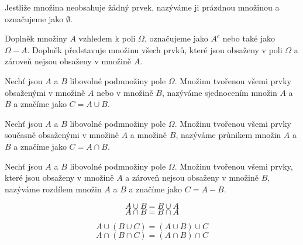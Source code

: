 \begin{definition}
Jestliže množina neobsahuje žádný prvek, nazýváme ji prázdnou množinou a označujeme jako $\emptyset$.
\end{definition}

\begin{definition}
Doplněk množiny $A$ vzhledem k poli $\Omega$, označujeme jako $A^{c}$ nebo také jako $\Omega - A$. Doplněk představuje množinu všech prvků, které jsou obsaženy v poli $\Omega$ a zároveň nejsou obsaženy v množině $A$.
\end{definition}

\begin{definition}
Nechť jsou $A$ a $B$ libovolné podmnožiny pole $\Omega$. Množinu tvořenou všemi prvky obsaženými v množině $A$ nebo v množině $B$, nazýváme sjednocením množin $A$ a $B$ a značíme jako $C = A \cup B$.
\end{definition}

\begin{definition}
Nechť jsou $A$ a $B$ libovolné podmnožiny pole $\Omega$. Množinu tvořenou všemi prvky současně obsaženými v množině $A$ a množině $B$, nazýváme průnikem množin $A$ a $B$ a značíme jako $C = A \cap B$.
\end{definition}

\begin{definition}
Nechť jsou $A$ a $B$ libovolné podmnožiny pole $\Omega$. Množinu tvořenou všemi prvky, které jsou obsaženy v množině $A$ a zároveň nejsou obsaženy v množině $B$, nazýváme rozdílem množin $A$ a $B$ a značíme jako $C = A - B$.
\end{definition}

\begin{theorem}
\begin{equation*}
A \cup B = B \cup A
\end{equation*}
\begin{equation*}
A \cap B = B \cap A
\end{equation*}
\end{theorem}

\begin{theorem}
\begin{equation*}
A \cup (B \cup C) = (A \cup B) \cup C
\end{equation*}
\begin{equation*}
A \cap (B \cap C) = (A \cap B) \cap C
\end{equation*}
\end{theorem}

